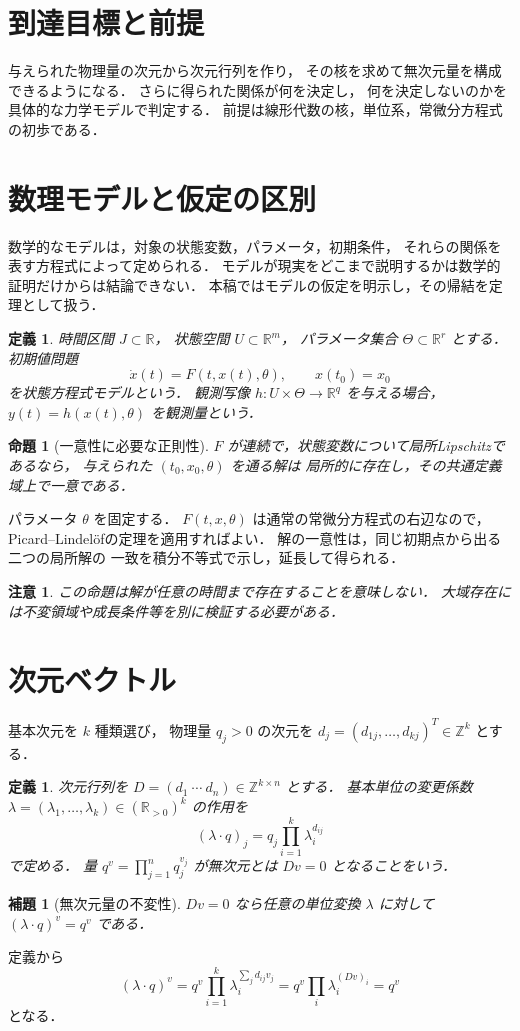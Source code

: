 \documentclass[a5paper,10pt,onecolumn]{jsarticle}
\makeatletter
\theoremstyle{mathnotetheorem}
\newtheorem{definition}[theorem]{定義}
\newtheorem{lemma}[theorem]{補題}
\newtheorem{proposition}[theorem]{命題}
\newtheorem{remark}[theorem]{注意}
\renewcommand{\proofname}{証明}
\renewenvironment{proof}[1][\proofname]{%
  \par\pushQED{\qed}\normalfont\topsep4\p@\@plus2\p@\relax
  \trivlist\item[\hskip\labelsep\bfseries #1]\ignorespaces
}{\popQED\endtrivlist\@endpefalse}
\makeatother
\begin{document}
\section*{到達目標と前提}
与えられた物理量の次元から次元行列を作り，
その核を求めて無次元量を構成できるようになる．
さらに得られた関係が何を決定し，
何を決定しないのかを具体的な力学モデルで判定する．
前提は線形代数の核，単位系，常微分方程式の初歩である．

\section{数理モデルと仮定の区別}
数学的なモデルは，対象の状態変数，パラメータ，初期条件，
それらの関係を表す方程式によって定められる．
モデルが現実をどこまで説明するかは数学的証明だけからは結論できない．
本稿ではモデルの仮定を明示し，その帰結を定理として扱う．
\begin{definition}
時間区間 $J\subset\mathbb R$，
状態空間 $U\subset\mathbb R^m$，
パラメータ集合 $\Theta\subset\mathbb R^r$ とする．
初期値問題
\[
 \dot x(t)=F(t,x(t),\theta),\qquad x(t_0)=x_0
\]
を状態方程式モデルという．
観測写像 $h:U\times\Theta\to\mathbb R^q$ を与える場合，
$y(t)=h(x(t),\theta)$ を観測量という．
\end{definition}
\begin{proposition}[一意性に必要な正則性]
$F$ が連続で，状態変数について局所Lipschitzであるなら，
与えられた $(t_0,x_0,\theta)$ を通る解は
局所的に存在し，その共通定義域上で一意である．
\end{proposition}
\begin{proof}
パラメータ $\theta$ を固定する．
$F(t,x,\theta)$ は通常の常微分方程式の右辺なので，
Picard--Lindel\"ofの定理を適用すればよい．
解の一意性は，同じ初期点から出る二つの局所解の
一致を積分不等式で示し，延長して得られる．
\end{proof}
\begin{remark}
この命題は解が任意の時間まで存在することを意味しない．
大域存在には不変領域や成長条件等を別に検証する必要がある．
\end{remark}
\section{次元ベクトル}
基本次元を $k$ 種類選び，
物理量 $q_j>0$ の次元を
$d_j=(d_{1j},\ldots,d_{kj})^T\in\mathbb Z^k$ とする．
\begin{definition}
次元行列を
$D=(d_1\ \cdots\ d_n)\in\mathbb Z^{k\times n}$ とする．
基本単位の変更係数
$\lambda=(\lambda_1,\ldots,\lambda_k)\in(\mathbb R_{>0})^k$
の作用を
\[
 (\lambda\cdot q)_j=q_j\prod_{i=1}^k\lambda_i^{d_{ij}}
\]
で定める．
量 $q^v=\prod_{j=1}^nq_j^{v_j}$ が無次元とは
$Dv=0$ となることをいう．
\end{definition}
\begin{lemma}[無次元量の不変性]
$Dv=0$ なら任意の単位変換 $\lambda$ に対して
$(\lambda\cdot q)^v=q^v$ である．
\end{lemma}
\begin{proof}
定義から
\[
 (\lambda\cdot q)^v
 =q^v\prod_{i=1}^k
 \lambda_i^{\sum_jd_{ij}v_j}
 =q^v\prod_i\lambda_i^{(Dv)_i}=q^v
\]
となる．
\end{proof}
\end{document}
